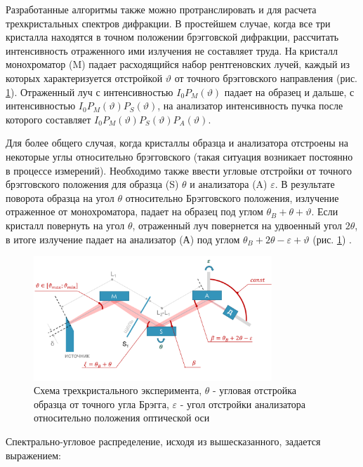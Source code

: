 Разработанные алгоритмы также можно протранслировать и для расчета трехкристальных спектров дифракции.
В простейшем случае, когда все три кристалла находятся в точном положении брэгговской дифракции, рассчитать
интенсивность отраженного ими излучения не составляет труда.
На кристалл монохроматор (M) падает расходящийся набор рентгеновских лучей, каждый из которых характеризуется отстройкой
$\vartheta$ от точного брэгговского направления (рис. \ref{ris:triple_crystal_schem}). Отраженный луч с интенсивностью
$I_0 P_M(\vartheta)$ падает на образец и дальше, с интенсивностью $I_0 P_M(\vartheta)P_S(\vartheta)$,
  на анализатор интенсивность пучка после которого составляет $I_0 P_M(\vartheta)P_S(\vartheta)P_A(\vartheta)$.

Для более общего случая, когда кристаллы образца и анализатора отстроены на некоторые углы относительно
брэгговского (такая ситуация возникает постоянно в процессе измерений).
Необходимо также ввести угловые отстройки от точного брэгговского положения
для образца (S) $\theta$ и анализатора (A) $\varepsilon$.
В результате поворота образца на угол  $\theta$ относительно Брэгговского положения,
излучение отраженное от монохроматора, падает на образец
под углом $\theta_B+\theta+\vartheta$. Если кристалл повернуть на угол $\theta$,
 отраженный луч повернется на удвоенный угол
$2\theta$, в итоге излучение падает на анализатор (А) под углом $\theta_B+2\theta-\varepsilon+\vartheta$ (рис. \ref{ris:triple_crystal_schem}) \cite{trd_Bushuev_1997}.
\begin{figure}[H]
  \centering
  \includegraphics[width=0.8\textwidth]{images/triple_crystal_schem.png}
  \caption{Схема трехкристального эксперимента, $\theta$ - угловая отстройка образца от точного угла Брэгга,
  $\varepsilon$ - угол отстройки анализатора относительно положения оптической оси}
  \label{ris:triple_crystal_schem}
\end{figure}

Спектрально-угловое распределение, исходя из вышесказанного, задается выражением:

